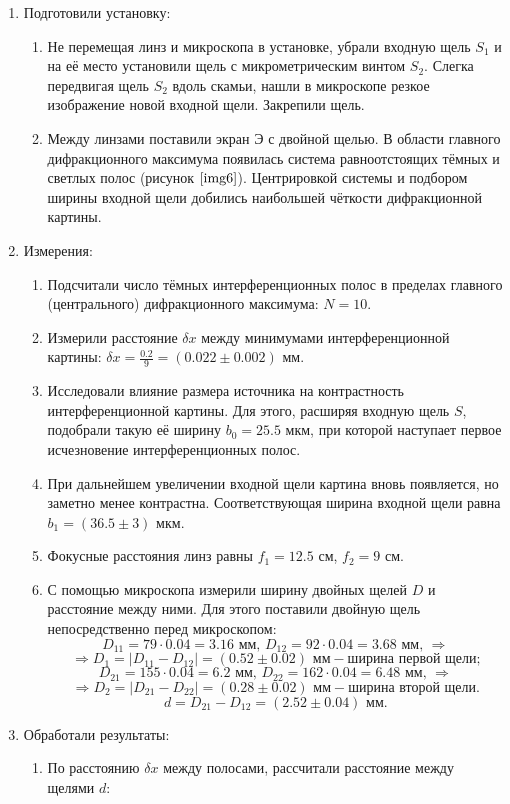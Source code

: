 \documentclass[a4paper,12pt]{article} %
\begin{document}
\begin{enumerate}
    \item Подготовили установку:
    \begin{enumerate}
        \item Не перемещая линз и микроскопа в установке, убрали входную щель $S_1$ и на её место установили щель с микрометрическим винтом $S_2$. Слегка передвигая щель $S_2$ вдоль скамьи, нашли в микроскопе резкое изображение новой входной щели. Закрепили щель.
        \item Между линзами поставили экран $\text{Э}$ с двойной щелью. В области главного дифракционного максимума появилась система равноотстоящих тёмных и светлых полос (рисунок $\ref{img6}$). Центрировкой системы и подбором ширины входной щели добились наибольшей чёткости дифракционной картины.
    \end{enumerate}
    \item Измерения:
    \begin{enumerate}
        \item Подсчитали число тёмных интерференционных полос в пределах главного (центрального) дифракционного максимума: $N=10$.
        \item Измерили расстояние $\delta x$ между минимумами интерференционной картины: $\delta x=\frac{0.2}{9}=(0.022\pm0.002)\text{ мм}$.
        \item Исследовали влияние размера источника на контрастность интерференционной картины. Для этого, расширяя входную щель $S$, подобрали такую её ширину $b_0=25.5\text{ мкм}$, при которой наступает первое исчезновение интерференционных полос.
        \item При дальнейшем увеличении входной щели картина вновь появляется, но заметно менее контрастна. Соответствующая ширина входной щели равна $b_1=(36.5\pm3)\text{ мкм}$.
        \item Фокусные расстояния линз равны $f_1=12.5\text{ см}$, $f_2=9\text{ см}$.
        \item С помощью микроскопа измерили ширину двойных щелей $D$ и расстояние между ними. Для этого поставили двойную щель непосредственно перед микроскопом:
            \[ D_{11} = 79\cdot0.04=3.16\text{ мм, }D_{12} = 92\cdot0.04=3.68\text{ мм, }\Rightarrow \]
            \[ \Rightarrow D_1=|D_{11}-D_{12}|=(0.52\pm0.02)\text{ мм} -\text{ширина первой щели;} \]
            \[ D_{21} = 155\cdot0.04=6.2\text{ мм, }D_{22} = 162\cdot0.04=6.48\text{ мм, }\Rightarrow\]
            \[\Rightarrow D_2=|D_{21}-D_{22}|=(0.28\pm0.02)\text{ мм} -\text{ширина второй щели.} \]
            \[ d = D_{21}-D_{12}=(2.52\pm0.04)\text{ мм}. \]
    \end{enumerate}
    \item Обработали результаты:
    \begin{enumerate}
        \item По расстоянию $\delta x$ между полосами, рассчитали расстояние между щелями $d$:


\end{enumerate}
\end{enumerate}
\end{document}
